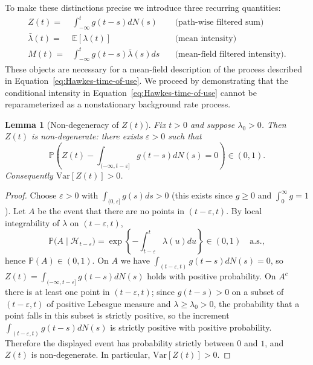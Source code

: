 \documentclass{article}
\theoremstyle{plain}
\newtheorem{lemma}[theorem]{Lemma}
\theoremstyle{definition}
\newcommand{\E}{\mathbb{E}}
\newcommand{\Var}{\mathrm{Var}}
\newcommand{\1}{\mathbf{1}}
\newcommand{\PP}{\mathbb{P}}
\begin{document}
    To make these distinctions precise we introduce three recurring quantities:
    \begin{align*}
    Z(t)=&\int_{-\infty}^t g(t-s) dN(s)\quad&\text{(path-wise filtered sum)}\\
    \bar\lambda(t)=&\E[\lambda(t)]\quad&\text{(mean intensity)}\\
    M(t)=&\int_{-\infty}^t g(t-s) \bar\lambda(s) ds\quad&\text{(mean-field filtered intensity)}.
    \end{align*}
    These objects are necessary for a mean-field description of the process described in Equation~\ref{eq:Hawkes-time-of-use}. We proceed by demonstrating that the conditional intensity in Equation~\ref{eq:Hawkes-time-of-use} cannot be reparameterized as a nonstationary background rate process.
    
    \begin{lemma}[Non-degeneracy of $Z(t)$]
    \label{lem:Z-nondegenerate}
    Fix $t>0$ and suppose $\lambda_0>0$. Then $Z(t)$ is non-degenerate: there exists $\varepsilon>0$ such that
    \[
    \PP \left(Z(t)-  \int_{(-\infty,t-\varepsilon]}g(t-s) dN(s)=0\right)\in(0,1).
    \]
    Consequently $\Var[Z(t)]>0$.
    \end{lemma}
    \begin{proof}
    Choose $\varepsilon>0$ with $\int_{(0,\varepsilon]} g(s) ds>0$ (this exists since $g\ge 0$ and $\int_0^\infty g=1$). Let $A$ be the event that there are no points in $(t-\varepsilon,t)$. By local integrability of $\lambda$ on $(t-\varepsilon,t)$,
    \[
    \PP \big(A\mid\mathcal H_{t-\varepsilon}\big)=\exp \left\{-\int_{t-\varepsilon}^t \lambda(u) du\right\}\in(0,1)\quad\text{a.s.},
    \]
    hence $\PP(A)\in(0,1)$. On $A$ we have $\int_{(t-\varepsilon,t)} g(t-s) dN(s)=0$, so
    \(
    Z(t)=\int_{(-\infty,t-\varepsilon]}g(t-s) dN(s)
    \)
    holds with positive probability. On $A^c$ there is at least one point in $(t-\varepsilon,t)$; since $g(t-s)>0$ on a subset of $(t-\varepsilon,t)$ of positive Lebesgue measure and $\lambda\ge \lambda_0>0$, the probability that a point falls in this subset is strictly positive, so the increment $\int_{(t-\varepsilon,t)} g(t-s) dN(s)$ is strictly positive with positive probability. Therefore the displayed event has probability strictly between $0$ and $1$, and $Z(t)$ is non-degenerate. In particular, $\Var[Z(t)]>0$.
    \end{proof}
    
\end{document}
